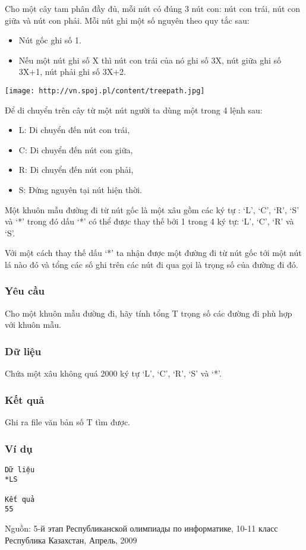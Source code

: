 



   Cho một cây tam phân đầy đủ, mỗi nút có đúng 3 nút con: nút con trái, nút con giữa và nút con phải. Mỗi nút ghi một số nguyên theo quy tắc sau:  
\begin{itemize}
	\item     Nút gốc ghi số 1.   
	\item     Nếu một nút ghi số X thì nút con trái của nó ghi số 3X, nút giữa ghi số 3X+1, nút phải ghi số 3X+2.   
\end{itemize}
\texttt{[image: http://vn.spoj.pl/content/treepath.jpg]}

   Để di chuyển trên cây từ một nút người ta dùng một trong 4 lệnh sau:  
\begin{itemize}
	\item     L: Di chuyển đến nút con trái,   
	\item     C: Di chuyển đến nút con giữa,   
	\item     R: Di chuyển đến nút con phải,   
	\item     S: Đứng nguyên tại nút hiện thời.   
\end{itemize}

   Một khuôn mẫu đường đi từ nút gốc là một xâu gồm các ký tự : ‘L’, ‘C’, ‘R’, ‘S’ và ‘*’ trong đó dấu ‘*’ có thể được thay thế bởi 1 trong 4 ký tự: ‘L’, ‘C’, ‘R’ và ‘S’.  

   Với một cách thay thế dấu ‘*’ ta nhận được một đường đi từ nút gốc tới một nút lá nào đó và tổng các số ghi trên các nút đi qua gọi là trọng số của đường đi đó.  

\subsubsection{   Yêu cầu  }

   Cho một khuôn mẫu đường đi, hãy tính tổng T trọng số các đường đi phù hợp với khuôn mẫu.  

\subsubsection{   Dữ liệu  }

   Chứa một xâu không quá 2000 ký tự ‘L’, ‘C’, ‘R’, ‘S’ và ‘*’.  

\subsubsection{   Kết quả  }

   Ghi ra file văn bản số T tìm được.  

\subsubsection{   Ví dụ  }
\begin{verbatim}
Dữ liệu
*LS		

Kết quả
55
\end{verbatim}

   Nguồn: 5-й этап Республиканской олимпиады по информатике, 10-11 класс Республика Казахстан, Апрель, 2009  